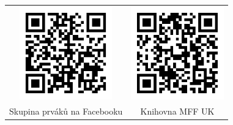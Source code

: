 \begin{tabular}{cc}
    \includegraphics[width=4cm]{Images/QR/facebook.png}&
    \includegraphics[width=4cm]{Images/QR/knihovna.png} \\
    Skupina prváků na Facebooku &
    Knihovna MFF UK
\end{tabular}